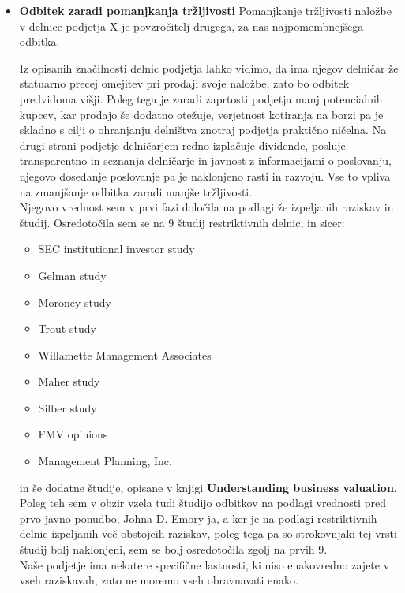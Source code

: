 \documentclass[12pt,a4paper]{amsart}
\theoremstyle{definition} %
\theoremstyle{plain} %
\begin{document}
\begin{itemize}
\item{\textbf{Odbitek zaradi pomanjkanja tržljivosti}}
Pomanjkanje tržljivosti naložbe v delnice podjetja X je povzročitelj drugega, za nas najpomembnejšega odbitka.\par
Iz opisanih značilnosti delnic podjetja lahko vidimo, da ima njegov delničar že statuarno precej omejitev pri prodaji svoje naložbe, zato bo odbitek predvidoma višji. Poleg tega je zaradi zaprtosti podjetja manj potencialnih kupcev, kar prodajo še dodatno otežuje, verjetnost kotiranja na borzi pa je skladno s cilji o ohranjanju delništva znotraj podjetja praktično ničelna. Na drugi strani podjetje delničarjem redno izplačuje dividende, posluje transparentno in seznanja delničarje in javnost z informacijami o poslovanju, njegovo dosedanje poslovanje pa je naklonjeno rasti in razvoju. Vse to vpliva na zmanjšanje odbitka zaradi manjše tržljivosti.\\
Njegovo vrednost sem v prvi fazi določila na podlagi že izpeljanih raziskav in študij. Osredotočila sem se na 9 študij restriktivnih delnic, in sicer:
\begin{itemize}
\item SEC institutional investor study
\item Gelman study
\item Moroney study
\item Trout study
\item Willamette Management Associates
\item Maher study
\item Silber study
\item FMV opinions
\item Management Planning, Inc.
\end{itemize}
in še dodatne študije, opisane v knjigi \textbf{Understanding business valuation}.
Poleg teh sem v obzir vzela tudi študijo odbitkov na podlagi vrednosti pred prvo javno ponudbo, Johna D. Emory-ja, a ker je na podlagi restriktivnih delnic izpeljanih več obstojeih raziskav, poleg tega pa so strokovnjaki tej vrsti študij bolj naklonjeni, sem se bolj osredotočila zgolj na prvih 9.\\
Naše podjetje ima nekatere specifične lastnosti, ki niso enakovredno zajete v vseh raziskavah, zato ne moremo vseh obravnavati enako.\par 

\end{itemize}
\end{document}
